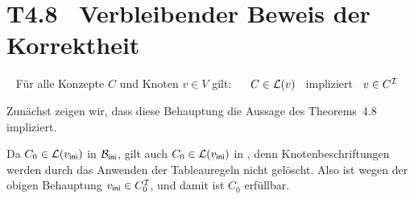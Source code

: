 \documentclass[fontsize=11pt, twoside=false, numbers=autoenddot]{scrbook}
\begin{document}
\newcommand{\TBewKorrTableauxOhne}{T4.8}
\section*{\hypertarget{TBewKorrTableauxOhne}{\TBewKorrTableauxOhne}~ Verbleibender Beweis der Korrektheit}

~
Für alle Konzepte $C$ und Knoten $v \in V$ gilt:
~~
$C \in \mathcal{L}(v)$
~impliziert~
$v \in C^\mathcal{I}$

\par\medskip
Zunächst zeigen wir, dass diese Behauptung die Aussage
des Theorems~4.8 impliziert.

Da $C_0 \in \mathcal{L}(v_{\textsf{ini}})$ in $\mathcal{B}_{\textsf{ini}}$,
gilt auch $C_0 \in \mathcal{L}(v_{\textsf{ini}})$ in \Bmc,
denn Knotenbeschriftungen werden durch das Anwenden der Tableauregeln
nicht gelöscht.
Also ist wegen der obigen Behauptung $v_{\textsf{ini}} \in C_0^\mathcal{I}$,
und damit ist $C_0$ erfüllbar.
\end{document}
